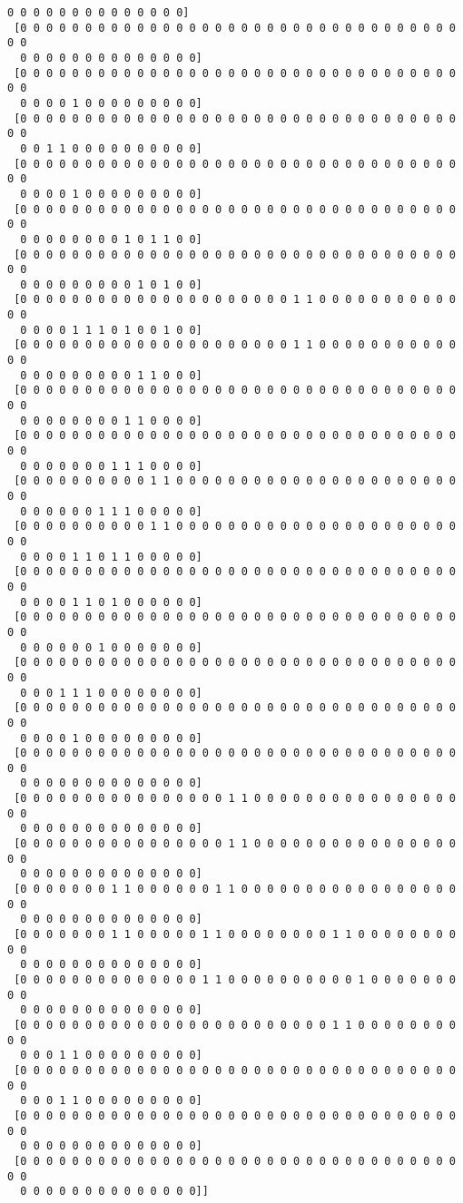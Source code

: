 \documentclass[11pt]{article}
\begin{document}
\begin{Verbatim}[commandchars=\\\{\}]
  0 0 0 0 0 0 0 0 0 0 0 0 0 0]
 [0 0 0 0 0 0 0 0 0 0 0 0 0 0 0 0 0 0 0 0 0 0 0 0 0 0 0 0 0 0 0 0 0 0 0 0
  0 0 0 0 0 0 0 0 0 0 0 0 0 0]
 [0 0 0 0 0 0 0 0 0 0 0 0 0 0 0 0 0 0 0 0 0 0 0 0 0 0 0 0 0 0 0 0 0 0 0 0
  0 0 0 0 1 0 0 0 0 0 0 0 0 0]
 [0 0 0 0 0 0 0 0 0 0 0 0 0 0 0 0 0 0 0 0 0 0 0 0 0 0 0 0 0 0 0 0 0 0 0 0
  0 0 1 1 0 0 0 0 0 0 0 0 0 0]
 [0 0 0 0 0 0 0 0 0 0 0 0 0 0 0 0 0 0 0 0 0 0 0 0 0 0 0 0 0 0 0 0 0 0 0 0
  0 0 0 0 1 0 0 0 0 0 0 0 0 0]
 [0 0 0 0 0 0 0 0 0 0 0 0 0 0 0 0 0 0 0 0 0 0 0 0 0 0 0 0 0 0 0 0 0 0 0 0
  0 0 0 0 0 0 0 0 1 0 1 1 0 0]
 [0 0 0 0 0 0 0 0 0 0 0 0 0 0 0 0 0 0 0 0 0 0 0 0 0 0 0 0 0 0 0 0 0 0 0 0
  0 0 0 0 0 0 0 0 0 1 0 1 0 0]
 [0 0 0 0 0 0 0 0 0 0 0 0 0 0 0 0 0 0 0 0 0 1 1 0 0 0 0 0 0 0 0 0 0 0 0 0
  0 0 0 0 1 1 1 0 1 0 0 1 0 0]
 [0 0 0 0 0 0 0 0 0 0 0 0 0 0 0 0 0 0 0 0 0 1 1 0 0 0 0 0 0 0 0 0 0 0 0 0
  0 0 0 0 0 0 0 0 0 1 1 0 0 0]
 [0 0 0 0 0 0 0 0 0 0 0 0 0 0 0 0 0 0 0 0 0 0 0 0 0 0 0 0 0 0 0 0 0 0 0 0
  0 0 0 0 0 0 0 0 1 1 0 0 0 0]
 [0 0 0 0 0 0 0 0 0 0 0 0 0 0 0 0 0 0 0 0 0 0 0 0 0 0 0 0 0 0 0 0 0 0 0 0
  0 0 0 0 0 0 0 1 1 1 0 0 0 0]
 [0 0 0 0 0 0 0 0 0 0 1 1 0 0 0 0 0 0 0 0 0 0 0 0 0 0 0 0 0 0 0 0 0 0 0 0
  0 0 0 0 0 0 1 1 1 0 0 0 0 0]
 [0 0 0 0 0 0 0 0 0 0 1 1 0 0 0 0 0 0 0 0 0 0 0 0 0 0 0 0 0 0 0 0 0 0 0 0
  0 0 0 0 1 1 0 1 1 0 0 0 0 0]
 [0 0 0 0 0 0 0 0 0 0 0 0 0 0 0 0 0 0 0 0 0 0 0 0 0 0 0 0 0 0 0 0 0 0 0 0
  0 0 0 0 1 1 0 1 0 0 0 0 0 0]
 [0 0 0 0 0 0 0 0 0 0 0 0 0 0 0 0 0 0 0 0 0 0 0 0 0 0 0 0 0 0 0 0 0 0 0 0
  0 0 0 0 0 0 1 0 0 0 0 0 0 0]
 [0 0 0 0 0 0 0 0 0 0 0 0 0 0 0 0 0 0 0 0 0 0 0 0 0 0 0 0 0 0 0 0 0 0 0 0
  0 0 0 1 1 1 0 0 0 0 0 0 0 0]
 [0 0 0 0 0 0 0 0 0 0 0 0 0 0 0 0 0 0 0 0 0 0 0 0 0 0 0 0 0 0 0 0 0 0 0 0
  0 0 0 0 1 0 0 0 0 0 0 0 0 0]
 [0 0 0 0 0 0 0 0 0 0 0 0 0 0 0 0 0 0 0 0 0 0 0 0 0 0 0 0 0 0 0 0 0 0 0 0
  0 0 0 0 0 0 0 0 0 0 0 0 0 0]
 [0 0 0 0 0 0 0 0 0 0 0 0 0 0 0 0 1 1 0 0 0 0 0 0 0 0 0 0 0 0 0 0 0 0 0 0
  0 0 0 0 0 0 0 0 0 0 0 0 0 0]
 [0 0 0 0 0 0 0 0 0 0 0 0 0 0 0 0 1 1 0 0 0 0 0 0 0 0 0 0 0 0 0 0 0 0 0 0
  0 0 0 0 0 0 0 0 0 0 0 0 0 0]
 [0 0 0 0 0 0 0 1 1 0 0 0 0 0 0 1 1 0 0 0 0 0 0 0 0 0 0 0 0 0 0 0 0 0 0 0
  0 0 0 0 0 0 0 0 0 0 0 0 0 0]
 [0 0 0 0 0 0 0 1 1 0 0 0 0 0 1 1 0 0 0 0 0 0 0 0 1 1 0 0 0 0 0 0 0 0 0 0
  0 0 0 0 0 0 0 0 0 0 0 0 0 0]
 [0 0 0 0 0 0 0 0 0 0 0 0 0 0 1 1 0 0 0 0 0 0 0 0 0 0 1 0 0 0 0 0 0 0 0 0
  0 0 0 0 0 0 0 0 0 0 0 0 0 0]
 [0 0 0 0 0 0 0 0 0 0 0 0 0 0 0 0 0 0 0 0 0 0 0 0 1 1 0 0 0 0 0 0 0 0 0 0
  0 0 0 1 1 0 0 0 0 0 0 0 0 0]
 [0 0 0 0 0 0 0 0 0 0 0 0 0 0 0 0 0 0 0 0 0 0 0 0 0 0 0 0 0 0 0 0 0 0 0 0
  0 0 0 1 1 0 0 0 0 0 0 0 0 0]
 [0 0 0 0 0 0 0 0 0 0 0 0 0 0 0 0 0 0 0 0 0 0 0 0 0 0 0 0 0 0 0 0 0 0 0 0
  0 0 0 0 0 0 0 0 0 0 0 0 0 0]
 [0 0 0 0 0 0 0 0 0 0 0 0 0 0 0 0 0 0 0 0 0 0 0 0 0 0 0 0 0 0 0 0 0 0 0 0
  0 0 0 0 0 0 0 0 0 0 0 0 0 0]]

    \end{Verbatim}
\end{document}
